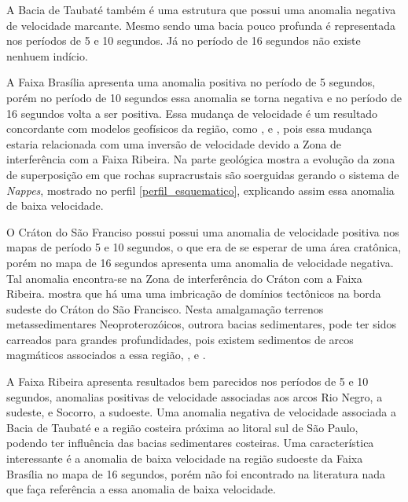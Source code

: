 A Bacia de Taubaté também é uma estrutura que possui uma anomalia negativa de velocidade marcante. Mesmo sendo uma bacia pouco profunda é representada nos períodos de 5 e 10 segundos. Já no período de 16 segundos não existe nenhuem indício.

A Faixa Brasília apresenta uma anomalia positiva no período de 5 segundos, porém no período de 10 segundos essa anomalia se torna negativa e no período de 16 segundos volta a ser positiva. Essa mudança de velocidade é um resultado concordante com modelos geofísicos da região, como \cite{sand_franca_crustal_2004}, \cite{flora_solon_ancient_2013} e \cite{Silva_2014}, pois essa mudança estaria relacionada com uma inversão de velocidade devido a Zona de interferência com a Faixa Ribeira. Na parte geológica \cite{trouw_new_2013} mostra a evolução da zona de superposição em que rochas supracrustais são soerguidas gerando o sistema de \textit{Nappes}, mostrado no perfil \ref{perfil_esquematico}, explicando assim essa anomalia de baixa velocidade.

O Cráton do São Franciso possui possui uma anomalia de velocidade positiva nos mapas de período 5 e 10 segundos, o que era de se esperar de uma área cratônica, porém no mapa de 16 segundos apresenta uma anomalia de velocidade negativa. Tal anomalia encontra-se na Zona de interferência do Cráton com a Faixa Ribeira. \cite{heilbron_serra_2013} mostra que há uma uma imbricação de domínios tectônicos na borda sudeste do Cráton do São Francisco. Nesta amalgamação terrenos metassedimentares Neoproterozóicos, outrora bacias sedimentares, pode ter sidos carreados para grandes profundidades, pois existem sedimentos de arcos magmáticos associados a essa região, \cite{heilbron_evolution_2010}, \cite{heilbron_serra_2013} e \cite{trouw_new_2013}. 

A Faixa Ribeira apresenta resultados bem parecidos nos períodos de 5 e 10 segundos, anomalias positivas de velocidade associadas aos arcos Rio Negro, a sudeste, e Socorro, a sudoeste. Uma anomalia negativa de velocidade associada a Bacia de Taubaté e a região costeira próxima ao litoral sul de São Paulo, podendo ter influência das bacias sedimentares costeiras. Uma característica interessante é a anomalia de baixa velocidade na região sudoeste da Faixa Brasília no mapa de 16 segundos, porém não foi encontrado na literatura nada que faça referência a essa anomalia de baixa velocidade.

